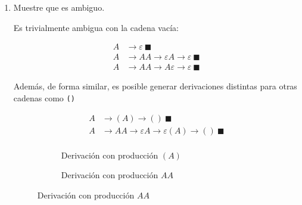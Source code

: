 \documentclass[a4paper, twoside, 12pt]{article}
\begin{document}
\begin{enumerate}
\begin{enumerate}
        \item Muestre que es ambiguo.

        Es trivialmente ambigua con la cadena vacía:

        \begin{align*}
            A & \rightarrow \varepsilon \ \blacksquare\\
            A & \rightarrow AA \rightarrow \varepsilon A \rightarrow \varepsilon \ \blacksquare \\
            A & \rightarrow AA\rightarrow A\varepsilon \rightarrow \varepsilon \ \blacksquare
        \end{align*}

        Además, de forma similar, es posible generar derivaciones distintas para otras cadenas como \texttt{()}

        \begin{align*}
            A & \rightarrow (A) \rightarrow () \  \blacksquare\\
            A & \rightarrow AA \rightarrow \varepsilon A \rightarrow \varepsilon(A) \rightarrow () \ \blacksquare \\
        \end{align*}

        
        \begin{figure}[H]
        \centering
        
        \begin{subfigure}{0.8\linewidth}
        \centering
        \caption{Derivación con producción $(A)$}
        \end{subfigure}
        \hspace{1cm}
        
        \begin{subfigure}{0.8\linewidth}
        \centering
        
        \caption{Derivación con producción $AA$}
        \end{subfigure}
        

\end{figure}
\end{enumerate}
\end{enumerate}
\end{document}
